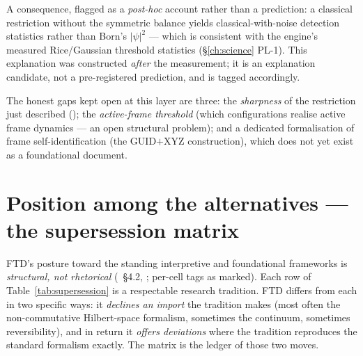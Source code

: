 A consequence, flagged as a \emph{post-hoc} account rather than a prediction: a
classical restriction without the symmetric balance yields
classical-with-noise detection statistics rather than Born's $|\psi|^2$ --- which
is consistent with the engine's measured Rice/Gaussian threshold statistics
(\S\ref{ch:science} PL-1). This explanation was constructed \emph{after} the
measurement; it is an explanation candidate, not a pre-registered prediction,
and is tagged accordingly.

The honest gaps kept open at this layer are three: the \emph{sharpness} of the
restriction just described (); the \emph{active-frame threshold}
(which configurations realise active frame dynamics --- an open structural
problem); and a dedicated formalisation of frame self-identification (the
GUID$+$XYZ construction), which does not yet exist as a foundational document.

\section{Position among the alternatives --- the supersession matrix}
\label{sec:phil-supersession}

FTD's posture toward the standing interpretive and foundational frameworks is
\emph{structural, not rhetorical} (~\S4.2, ; per-cell tags
as marked). Each row of Table~\ref{tab:supersession} is a respectable research
tradition. FTD differs from each in two specific ways: it \emph{declines an
import} the tradition makes (most often the non-commutative Hilbert-space
formalism, sometimes the continuum, sometimes reversibility), and in return it
\emph{offers deviations} where the tradition reproduces the standard formalism
exactly. The matrix is the ledger of those two moves.

